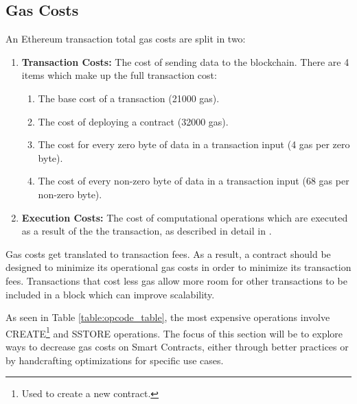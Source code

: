 \subsection{Gas Costs}
An Ethereum transaction total gas costs are split in two: %
\begin{enumerate}
    \item \textbf{Transaction Costs:} The cost of sending data to the blockchain. There are 4 items which make up the full transaction cost:
        \begin{enumerate}
            \item The base cost of a transaction (21000 gas). %
            \item The cost of deploying a contract (32000 gas).
            \item The cost for every zero byte of data in a transaction input (4 gas per zero byte).
            \item The cost of every non-zero byte of data in a transaction input (68 gas per non-zero byte).
        \end{enumerate}
    \item \textbf{Execution Costs:} The cost of computational operations which are executed as a result of the the transaction, as described in detail in \cite{ethereum, gas}.
\end{enumerate} 

Gas costs get translated to transaction fees. As a result, a contract should be designed to minimize its operational gas costs in order to minimize its transaction fees. Transactions that cost less gas allow more room for other transactions to be included in a block which can improve scalability. %




As seen in Table \ref{table:opcode_table}, the most expensive operations involve CREATE\footnote{Used to create a new contract.} and SSTORE operations. The focus of this section will be to explore ways to decrease gas costs on Smart Contracts, either through better practices or by handcrafting optimizations for specific use cases.

